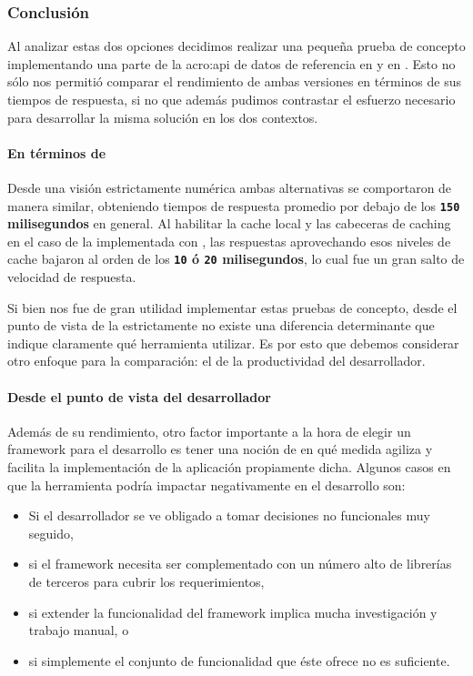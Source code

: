 \subsubsection{Conclusión}
\label{soa:tecnologias:apps:conclusion}

Al analizar estas dos opciones decidimos realizar una pequeña prueba de concepto implementando una parte de la \gls{acro:api} de datos de referencia en  y en . Esto no sólo nos permitió comparar el rendimiento de ambas versiones en términos de sus tiempos de respuesta, si no que además pudimos contrastar el esfuerzo necesario para desarrollar la misma solución en los dos contextos.

\paragraph{En términos de }

Desde una visión estrictamente numérica ambas alternativas se comportaron de manera similar, obteniendo tiempos de respuesta promedio por debajo de los \textbf{\texttt{150} milisegundos} en general. Al habilitar la cache local y las cabeceras de caching en el caso de la implementada con , las respuestas aprovechando esos niveles de cache bajaron al orden de los \textbf{\texttt{10} ó \texttt{20} milisegundos}, lo cual fue un gran salto de velocidad de respuesta.

Si bien nos fue de gran utilidad implementar estas pruebas de concepto, desde el punto de vista de la  estrictamente no existe una diferencia determinante que indique claramente qué herramienta utilizar. Es por esto que debemos considerar otro enfoque para la comparación: el de la productividad del desarrollador.

\paragraph{Desde el punto de vista del desarrollador}

Además de su rendimiento, otro factor importante a la hora de elegir un framework para el desarrollo es tener una noción de en qué medida agiliza y facilita la implementación de la aplicación propiamente dicha. Algunos casos en que la herramienta podría impactar negativamente en el desarrollo son:

\begin{itemize}
  \item Si el desarrollador se ve obligado a tomar decisiones no funcionales muy seguido,
  \item si el framework necesita ser complementado con un número alto de librerías de terceros para cubrir los requerimientos,
  \item si extender la funcionalidad del framework implica mucha investigación y trabajo manual, o
  \item si simplemente el conjunto de funcionalidad que éste ofrece no es suficiente.
\end{itemize}

